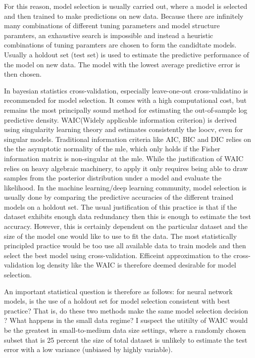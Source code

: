 \documentclass[]{report}
\begin{document}
\begin{enumerate}
For this reason, model selection is usually carried out, where a model is selected and then trained to make predictions on new data. Because there are infinitely many combinations of different tuning parameters and model structure paramters, an exhaustive search is impossible and instead a heuristic combinations of tuning paramters are chosen to form the candidtate models. Usually a holdout set (test set) is used to estimate the predictive performance of the model on new data. The model with the lowest average predictive error is then chosen. 

In bayesian statistics \cite{gelman2014bayesian} cross-validation, especially leave-one-out cross-validatino is recommended for model selection. It comes with a high computational cost, but remains the most principally sound method for estimating the out-of-sample log predictive density. WAIC(Widely applicable information criterion) is derived using singularity learning theory and estimates consistently the loocv, even for singular models. Traditional information criteria like AIC, BIC and DIC relies on the the asymptotic normality of the mle, which only holds if the Fisher information matrix is non-singular at the mle. While the justification of WAIC relies on heavy algebraic machinery, to apply it only requires being able to draw samples from the posterior distribution under a model and evaluate the likelihood.  
In the machine learning/deep learning community, model selection is usually done
by comparing the predictive accuracies of the different trained models on a
holdout set. The usual justification of this practice is that if the dataset
exhibits enough data redundancy then  this is enough to estimate the test
accuracy. However, this is certainly dependent on the particular dataset and the
size of the model one would like to use to fit the data. The most statistically
principled practice would be too use all available data to train models and then
select the best model using cross-validation. Efficeint approximation to the
cross-validation log density like the WAIC is therefore deemed desirable for
model selection. 

An important statistical question is therefore as follows: for neural network models, is
the use of a holdout set for model selection consistent with best practice?
That is, do these two methods make the same model selection decision ? What happens
in the small data regime? I suspect the utitilty of WAIC would be the greatest
in small-to-medium data size settings, where a randomly chosen subset that is 25
percent the size of total dataset is unlikely to estimate the test error with a
low variance (unbiased by highly variable).


\end{enumerate}
\end{document}

